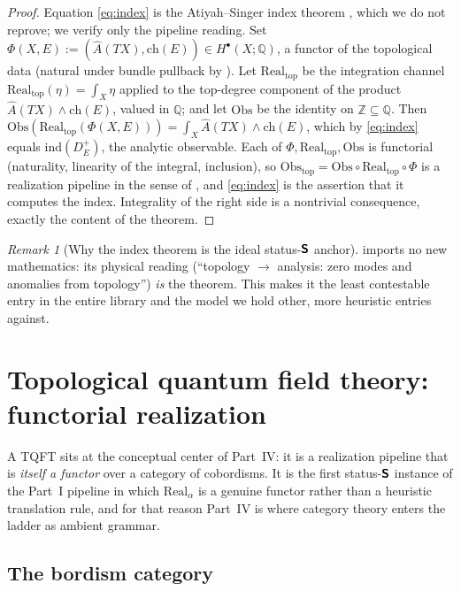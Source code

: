 \documentclass[12pt]{article}
\theoremstyle{definition}
\theoremstyle{remark}
\newtheorem{remark}[remark]{Remark}
\newcommand{\Real}{\mathrm{Real}}
\newcommand{\Obs}{\mathrm{Obs}}
\newcommand{\ind}{\mathrm{ind}}
\newcommand{\ch}{\mathrm{ch}}
\newcommand{\Ahat}{\widehat{A}}
\newcommand{\Zm}{\mathbb{Z}}
\newcommand{\Qm}{\mathbb{Q}}
\newcommand{\Sfont}{\textnormal{\sffamily\bfseries S}}
\begin{document}
\begin{proof}
Equation \eqref{eq:index} is the Atiyah--Singer index theorem
\cite{AtiyahSinger}, which we do not reprove; we verify only the pipeline reading.
Set $\Phi(X,E):=(\Ahat(TX),\ch(E))\in H^\bullet(X;\Qm)$, a functor of the
topological data (natural under bundle pullback by ). Let
$\Real_{\mathrm{top}}$ be the integration channel
$\Real_{\mathrm{top}}(\eta)=\int_X\eta$ applied to the top-degree component of the
product $\Ahat(TX)\wedge\ch(E)$, valued in $\Qm$; and let $\Obs$ be the identity on
$\Zm\subseteq\Qm$. Then $\Obs(\Real_{\mathrm{top}}(\Phi(X,E)))=\int_X\Ahat(TX)\wedge\ch(E)$,
which by \eqref{eq:index} equals $\ind(D_E^+)$, the analytic observable. Each of
$\Phi,\Real_{\mathrm{top}},\Obs$ is functorial (naturality, linearity of the
integral, inclusion), so $\Obs_{\mathrm{top}}=\Obs\circ\Real_{\mathrm{top}}\circ\Phi$
is a realization pipeline in the sense of , and \eqref{eq:index}
is the assertion that it computes the index. Integrality of the right side is a
nontrivial consequence, exactly the content of the theorem.
\end{proof}

\begin{remark}[Why the index theorem is the ideal status-$\Sfont$ anchor]
\label{rem:index-anchor}
 imports no new mathematics: its physical reading
(``topology $\to$ analysis: zero modes and anomalies from topology'') \emph{is} the
theorem. This makes it the least contestable entry in the entire library and the
model we hold other, more heuristic entries against.
\end{remark}

\section{Topological quantum field theory: functorial realization}
\label{sec:tqft}

A TQFT sits at the conceptual center of Part~IV: it is a realization pipeline
that is \emph{itself a functor} over a category of cobordisms. It is the first
status-$\Sfont$ instance of the Part~I pipeline in which $\Real_\alpha$ is a
genuine functor rather than a heuristic translation rule, and for that reason
Part~IV is where category theory enters the ladder as ambient grammar.

\subsection{The bordism category}
\end{document}
